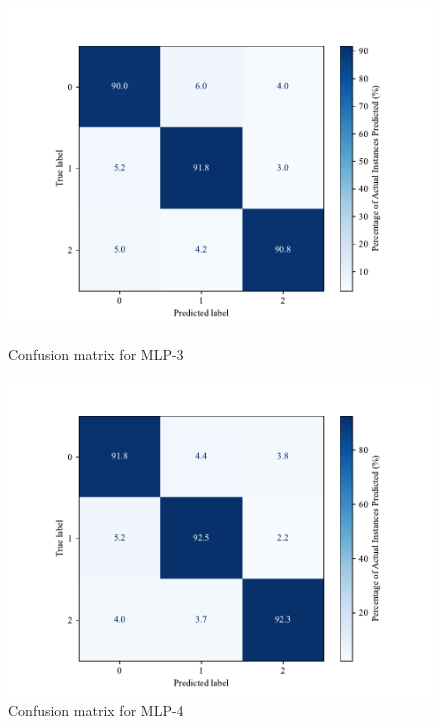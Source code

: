     \begin{figure}[H]
        \centering
        \begin{minipage}[b]{0.45\textwidth}
            \centering
            \includegraphics[width=\textwidth]{images/confusion_matrix_mlp100log.pdf}
            \caption{Confusion matrix for MLP-3}
            \label{fig:confusion_mlp_3}
        \end{minipage}
        \hfill
        \begin{minipage}[b]{0.45\textwidth}
            \centering
            \includegraphics[width=\textwidth]{images/confusion_matrix_mlp200log.pdf}
            \caption{Confusion matrix for MLP-4}
            \label{fig:confusion_mlp_4}
        \end{minipage}
    \end{figure}
    
